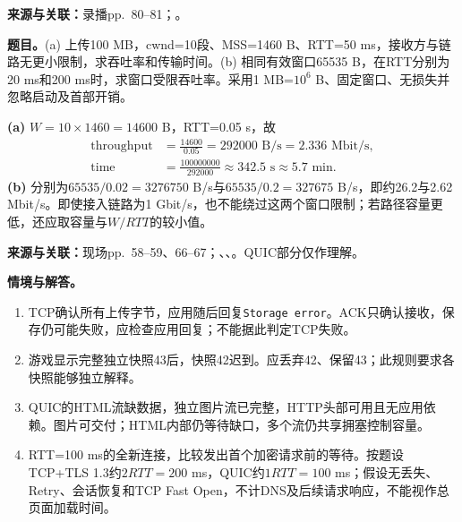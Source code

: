 
\textbf{来源与关联：}录播pp.~80--81；。

\textbf{题目。}(a) 上传100 MB，cwnd=10段、MSS=1460 B、RTT=50 ms，接收方与链路无更小限制，求吞吐率和传输时间。(b) 相同有效窗口65535 B，在RTT分别为20 ms和200 ms时，求窗口受限吞吐率。采用1 MB=$10^6$ B、固定窗口、无损失并忽略启动及首部开销。

\begin{workedsolution}
\nopagebreak[4]
\textbf{(a)} $W=10\times1460=14600$ B，RTT=0.05 s，故
\[
 \begin{aligned}
 \text{throughput}&=\frac{14600}{0.05}
 =292000\text{ B/s}=2.336\text{ Mbit/s},\\[3pt]
 \text{time}&=\frac{100000000}{292000}
 \approx342.5\text{ s}\approx5.7\text{ min}.
 \end{aligned}
\]
\textbf{(b)} 分别为$65535/0.02=3276750$ B/s与$65535/0.2=327675$ B/s，即约26.2与2.62 Mbit/s。即使接入链路为1 Gbit/s，也不能绕过这两个窗口限制；若路径容量更低，还应取容量与$W/RTT$的较小值。
\end{workedsolution}


\textbf{来源与关联：}现场pp.~58--59、66--67；、、。QUIC部分仅作理解。

\textbf{情境与解答。}
\begin{enumerate}[label=(\alph*)]
 \item TCP确认所有上传字节，应用随后回复\texttt{Storage error}。ACK只确认接收，保存仍可能失败，应检查应用回复；不能据此判定TCP失败。
 \item 游戏显示完整独立快照43后，快照42迟到。应丢弃42、保留43；此规则要求各快照能够独立解释。
 \item QUIC的HTML流缺数据，独立图片流已完整，HTTP头部可用且无应用依赖。图片可交付；HTML内部仍等待缺口，多个流仍共享拥塞控制容量。
 \item RTT=100 ms的全新连接，比较发出首个加密请求前的等待。按题设TCP+TLS 1.3约$2RTT=200$ ms，QUIC约$1RTT=100$ ms；假设无丢失、Retry、会话恢复和TCP Fast Open，不计DNS及后续请求响应，不能视作总页面加载时间。
\end{enumerate}
\endgroup
